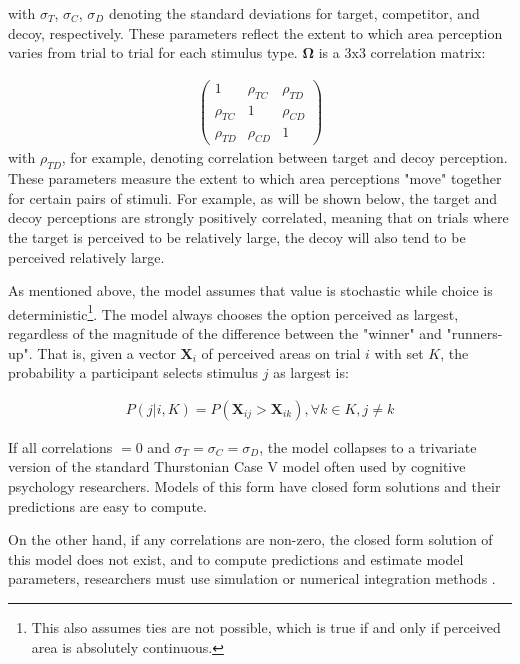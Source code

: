 with $\sigma_{T}$, $\sigma_{C}$, $\sigma_{D}$ denoting the standard deviations for target, competitor, and decoy, respectively. These parameters reflect the extent to which area perception varies from trial to trial for each stimulus type. $\boldsymbol{\Omega}$ is a $3\text{x}3$ correlation matrix:

\begin{align}
   \begin{pmatrix}
      1 & \rho_{TC} & \rho_{TD} \\
      \rho_{TC} & 1 & \rho_{CD} \\
      \rho_{TD} & \rho_{CD} & 1 
   \end{pmatrix}
\label{eqn:O}
\end{align}
with $\rho_{TD}$, for example, denoting correlation between target and decoy perception. These parameters measure the extent to which area perceptions "move" together for certain pairs of stimuli. For example, as will be shown below, the target and decoy perceptions are strongly positively correlated, meaning that on trials where the target is perceived to be relatively large, the decoy will also tend to be perceived relatively large.

As mentioned above, the model assumes that value is stochastic while choice is deterministic\footnote{This also assumes ties are not possible, which is true if and only if perceived area is absolutely continuous.}. The model always chooses the option perceived as largest, regardless of the magnitude of the difference between the "winner" and "runners-up". That is, given a vector $\mathbf{X}_i$ of perceived areas on trial $i$ with set $K$, the probability a participant selects stimulus $j$ as largest is:

\begin{align}
   P(j|i,K)=P(\mathbf{X}_{ij}>\mathbf{X}_{ik}), \forall k \in K, j \neq k
   \label{eqn:pchoice}
\end{align}

If all correlations $=0$ and $\sigma_{T}=\sigma_{C}=\sigma_{D}$, the model collapses to a trivariate version of the standard Thurstonian Case V model \parencite{thurstone1927law} often used by cognitive psychology researchers. Models of this form have closed form solutions and their predictions are easy to compute.

On the other hand, if any correlations are non-zero, the closed form solution of this model does not exist, and to compute predictions and estimate model parameters, researchers must use simulation or numerical integration methods \parencite{train2009discrete}. 

